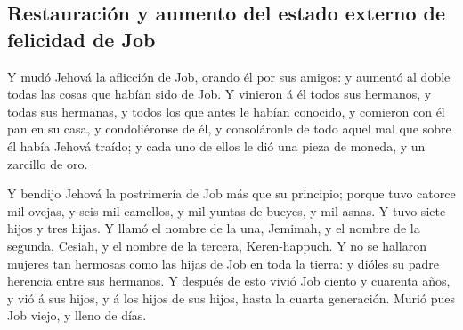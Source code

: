 \hypertarget{restauraciuxf3n-y-aumento-del-estado-externo-de-felicidad-de-job}{%
\subsection{Restauración y aumento del estado externo de felicidad de
Job}\label{restauraciuxf3n-y-aumento-del-estado-externo-de-felicidad-de-job}}

 Y mudó Jehová la aflicción de Job, orando él por sus
amigos: y aumentó al doble todas las cosas que habían sido de Job.
 Y vinieron á él todos sus hermanos, y todas sus hermanas,
y todos los que antes le habían conocido, y comieron con él pan en su
casa, y condoliéronse de él, y consoláronle de todo aquel mal que sobre
él había Jehová traído; y cada uno de ellos le dió una pieza de moneda,
y un zarcillo de oro.

 Y bendijo Jehová la postrimería de Job más que su
principio; porque tuvo catorce mil ovejas, y seis mil camellos, y mil
yuntas de bueyes, y mil asnas.  Y tuvo siete hijos y tres
hijas.  Y llamó el nombre de la una, Jemimah, y el nombre
de la segunda, Cesiah, y el nombre de la tercera, Keren-happuch.
 Y no se hallaron mujeres tan hermosas como las hijas de
Job en toda la tierra: y dióles su padre herencia entre sus hermanos.
 Y después de esto vivió Job ciento y cuarenta años, y vió
á sus hijos, y á los hijos de sus hijos, hasta la cuarta generación.
 Murió pues Job viejo, y lleno de días.

